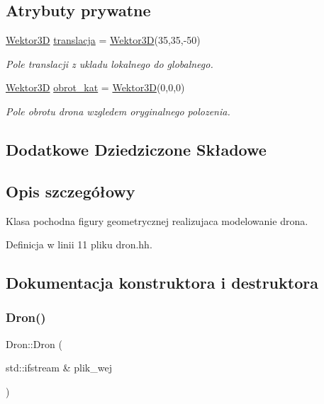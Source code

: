 \subsection*{Atrybuty prywatne}
\begin{DoxyCompactItemize}
\item 
\hyperlink{class_wektor3_d}{Wektor3D} \hyperlink{class_dron_a1b37296f6c286bde4e20c35d77bd03f6}{translacja} = \hyperlink{class_wektor3_d}{Wektor3D}(35,35,-\/50)
\begin{DoxyCompactList}\small\item\em Pole translacji z ukladu lokalnego do globalnego. \end{DoxyCompactList}\item 
\hyperlink{class_wektor3_d}{Wektor3D} \hyperlink{class_dron_a0d66fa60de16c265e4d008ab52cd5ab6}{obrot\+\_\+kat} = \hyperlink{class_wektor3_d}{Wektor3D}(0,0,0)
\begin{DoxyCompactList}\small\item\em Pole obrotu drona wzgledem oryginalnego polozenia. \end{DoxyCompactList}\end{DoxyCompactItemize}
\subsection*{Dodatkowe Dziedziczone Składowe}


\subsection{Opis szczegółowy}
Klasa pochodna figury geometrycznej realizujaca modelowanie drona. 

Definicja w linii 11 pliku dron.\+hh.



\subsection{Dokumentacja konstruktora i destruktora}
\mbox{\label{class_dron_a2a8365d22ed2630eec325588f0a99ae9}} 
\subsubsection{\texorpdfstring{Dron()}{Dron()}}
{\footnotesize\ttfamily Dron\+::\+Dron (\begin{DoxyParamCaption}\item[{std\+::ifstream \&}]{plik\+\_\+wej }\end{DoxyParamCaption})\hspace{0.3cm}{\ttfamily [inline]}}



